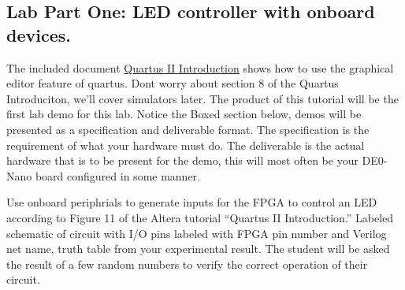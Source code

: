     \subsection{Lab Part One: LED controller with onboard devices.}
      The included document \href{ftp://ftp.altera.com/up/pub/Altera_Material/13.0/Tutorials/Schematic/Quartus_II_Introduction.pdf}{Quartus II Introduction} shows how to use the graphical editor feature of quartus. Dont worry about section 8 of the Quartus Introduciton, we'll cover simulators later. The product of this tutorial will be the first lab demo for this lab. Notice the Boxed section below, demos will be presented as a specification and deliverable format. The specification is the requirement of what your hardware must do. The deliverable is the actual hardware that is to be present for the demo, this will most often be your DE0-Nano board configured in some manner. 

                    {Use onboard periphrials to generate inputs for the FPGA to control an LED according to Figure 11 of the Altera tutorial ``Quartus II Introduction.''}
                    {Labeled schematic of circuit with I/O pins labeled with FPGA pin number and Verilog net name,  truth table from your  experimental result.}
                    {The student will be asked the result of a few random numbers to verify the correct operation of their circuit.}

